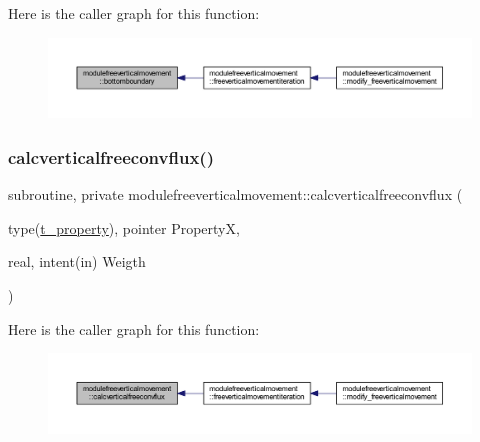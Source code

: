 Here is the caller graph for this function\+:\nopagebreak
\begin{figure}[H]
\begin{center}
\leavevmode
\includegraphics[width=350pt]{namespacemodulefreeverticalmovement_ad4e1681fa973f2a527c8fb380ad6fa31_icgraph}
\end{center}
\end{figure}
\mbox{\label{namespacemodulefreeverticalmovement_a42b3411647c7bb8c92b023c61a0c49cc}} 
\subsubsection{\texorpdfstring{calcverticalfreeconvflux()}{calcverticalfreeconvflux()}}
{\footnotesize\ttfamily subroutine, private modulefreeverticalmovement\+::calcverticalfreeconvflux (\begin{DoxyParamCaption}\item[{type(\mbox{\hyperlink{structmodulefreeverticalmovement_1_1t__property}{t\+\_\+property}}), pointer}]{PropertyX,  }\item[{real, intent(in)}]{Weigth }\end{DoxyParamCaption})\hspace{0.3cm}{\ttfamily [private]}}

Here is the caller graph for this function\+:\nopagebreak
\begin{figure}[H]
\begin{center}
\leavevmode
\includegraphics[width=350pt]{namespacemodulefreeverticalmovement_a42b3411647c7bb8c92b023c61a0c49cc_icgraph}
\end{center}
\end{figure}
\mbox{\label{namespacemodulefreeverticalmovement_a3b98553e1845617e703a449e92c798c9}} 
